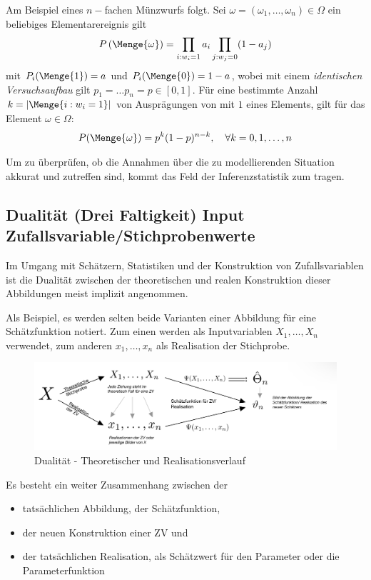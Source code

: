 Am Beispiel eines $n-$fachen Münzwurfs folgt. Sei $\omega = (\omega_1, \dots, \omega_n)\in \Omega$ ein beliebiges Elementarereignis gilt
\begin{align*}
	P\left(\Menge{\omega}\right) = \prod_{i:w_i=1} a_i \prod_{j:w_j=0}(1-a_j)
\end{align*}
mit $P_i(\Menge{1})=a$ und $P_i(\Menge{0})=1-a$, wobei mit einem \textit{identischen Versuchsaufbau} gilt $p_1=\dots p_n=p\in[0,1]$. Für eine bestimmte Anzahl $k=\left|\Menge{i:w_i=1}\right|$ von Ausprägungen von mit $1$ eines Elements, gilt für das Element $\omega\in \Omega$:
\begin{align*}
	P(\Menge{\omega}) = p^k(1-p)^{n-k}, \quad \forall k=0,1,\dots, n
\end{align*}

Um zu überprüfen, ob die Annahmen über die zu modellierenden Situation akkurat und zutreffen sind, kommt das Feld der Inferenzstatistik zum tragen.


	
\subsection{Dualität (Drei Faltigkeit) Input Zufallsvariable/Stichprobenwerte}
\label{subsec_Dualitaet_DreiFaltigkeit}
Im Umgang mit Schätzern, Statistiken und der Konstruktion von Zufallsvariablen ist die Dualität zwischen der theoretischen und realen Konstruktion dieser Abbildungen meist implizit angenommen. 

Als Beispiel, es werden selten beide Varianten einer Abbildung für eine Schätzfunktion notiert. Zum einen werden als Inputvariablen $X_1,\dots,X_n$ verwendet, zum anderen $x_1,\dots,x_n$ als Realisation der Stichprobe.

\begin{figure}[H]
	\centering
	\includegraphics[width=0.7\linewidth]{attachment/chapter_13/Scc072}
	\caption{Dualität - Theoretischer und Realisationsverlauf}
\end{figure}

Es besteht ein weiter Zusammenhang zwischen der 
\begin{itemize}
	\item tatsächlichen Abbildung, der Schätzfunktion,
	\item der neuen Konstruktion einer \gls{ZV} und
	\item der tatsächlichen Realisation, als Schätzwert für den Parameter oder die Parameterfunktion
\end{itemize}

